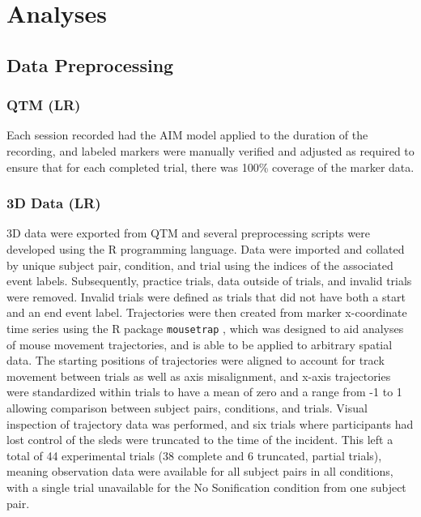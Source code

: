 \documentclass[10pt,a4paper,onecolumn]{article}
\begin{document}
\hypertarget{analyses}{%
\section{Analyses}\label{analyses}}

\hypertarget{data-preprocessing}{%
\subsection{Data Preprocessing}\label{data-preprocessing}}

\hypertarget{qtm-lr}{%
\subsubsection{QTM (LR)}\label{qtm-lr}}

Each session recorded had the AIM model applied to the duration of the recording, and labeled markers were manually verified and adjusted as required to ensure that for each completed trial, there was 100\% coverage of the marker data.

\hypertarget{d-data-lr}{%
\subsubsection{3D Data (LR)}\label{d-data-lr}}

3D data were exported from QTM and several preprocessing scripts were developed using the R programming language. Data were imported and collated by unique subject pair, condition, and trial using the indices of the associated event labels. Subsequently, practice trials, data outside of trials, and invalid trials were removed. Invalid trials were defined as trials that did not have both a start and an end event label. Trajectories were then created from marker x-coordinate time series using the R package \texttt{mousetrap} \autocite{mousetrap2021}, which was designed to aid analyses of mouse movement trajectories, and is able to be applied to arbitrary spatial data. The starting positions of trajectories were aligned to account for track movement between trials as well as axis misalignment, and x-axis trajectories were standardized within trials to have a mean of zero and a range from -1 to 1 allowing comparison between subject pairs, conditions, and trials. Visual inspection of trajectory data was performed, and six trials where participants had lost control of the sleds were truncated to the time of the incident. This left a total of 44 experimental trials (38 complete and 6 truncated, partial trials), meaning observation data were available for all subject pairs in all conditions, with a single trial unavailable for the No Sonification condition from one subject pair.
\end{document}
